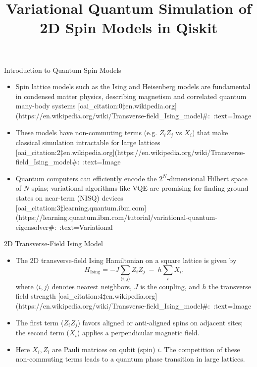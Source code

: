\documentclass{beamer}
\title{Variational Quantum Simulation of 2D Spin Models in Qiskit}
\date{}
\begin{document}
\begin{frame}{Introduction to Quantum Spin Models}
\begin{itemize}
\item Spin lattice models such as the Ising and Heisenberg models are fundamental in condensed matter physics, describing magnetism and correlated quantum many-body systems [oai_citation:0‡en.wikipedia.org](https://en.wikipedia.org/wiki/Transverse-field_Ising_model#:~:text=Image%
\item These models have non-commuting terms (e.g. $Z_iZ_j$ vs $X_i$) that make classical simulation intractable for large lattices [oai_citation:2‡en.wikipedia.org](https://en.wikipedia.org/wiki/Transverse-field_Ising_model#:~:text=Image%
\item Quantum computers can efficiently encode the $2^N$-dimensional Hilbert space of $N$ spins; variational algorithms like VQE are promising for finding ground states on near-term (NISQ) devices [oai_citation:3‡learning.quantum.ibm.com](https://learning.quantum.ibm.com/tutorial/variational-quantum-eigensolver#:~:text=Variational%
\end{itemize}
\end{frame}

\begin{frame}{2D Transverse-Field Ising Model}
\begin{itemize}
\item The 2D transverse-field Ising Hamiltonian on a square lattice is given by
\[
H_{\text{Ising}} = -J \sum_{\langle i,j\rangle} Z_i Z_j \;-\; h \sum_{i} X_i,
\]
where $\langle i,j\rangle$ denotes nearest neighbors, $J$ is the coupling, and $h$ the transverse field strength [oai_citation:4‡en.wikipedia.org](https://en.wikipedia.org/wiki/Transverse-field_Ising_model#:~:text=Image%
\item The first term ($Z_iZ_j$) favors aligned or anti-aligned spins on adjacent sites; the second term ($X_i$) applies a perpendicular magnetic field.
\item Here $X_i,Z_i$ are Pauli matrices on qubit (spin) $i$. The competition of these non-commuting terms leads to a quantum phase transition in large lattices.
\end{itemize}
\end{frame}
\end{document}
